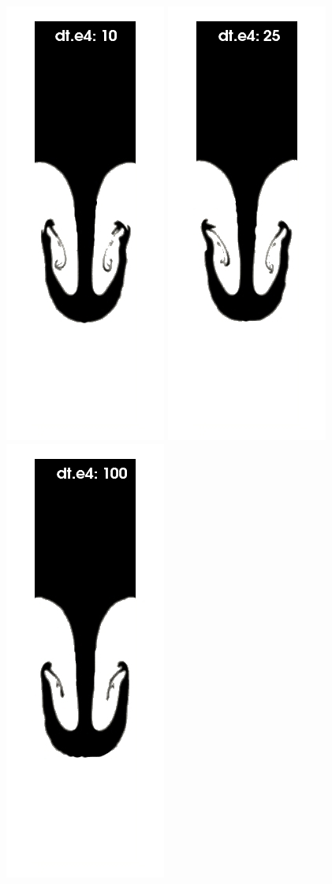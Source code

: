 \documentclass[a4paper,conference]{IEEEtran}
\begin{document}
\begin{figure}
\begin{center}
      \includegraphics[width=.24\columnwidth]{images/rayleigh_pfem_dts_A.jpg}
      \includegraphics[width=.24\columnwidth]{images/rayleigh_pfem_dts_B.jpg}
      \includegraphics[width=.24\columnwidth]{images/rayleigh_pfem_dts_C.jpg}

\end{center}
\end{figure}
\end{document}
